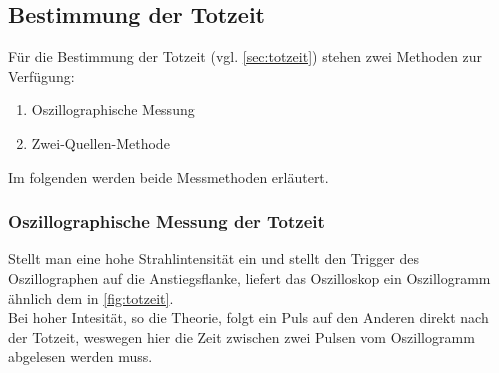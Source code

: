 \subsection{Bestimmung der Totzeit}
\label{sec:bestimmung-totzeit}

Für die Bestimmung der Totzeit (vgl. \autoref{sec:totzeit}) stehen zwei Methoden zur Verfügung:
\begin{enumerate}
	\item Oszillographische Messung
	\item Zwei-Quellen-Methode
\end{enumerate}
Im folgenden werden beide Messmethoden erläutert.

\subsubsection{Oszillographische Messung der Totzeit}
\label{sec:theo:oszillographisch}

Stellt man eine hohe Strahlintensität ein und stellt den Trigger des Oszillographen auf die Anstiegsflanke, liefert
das Oszilloskop ein Oszillogramm ähnlich dem in \autoref{fig:totzeit}.
\\
Bei hoher Intesität, so die Theorie, folgt ein Puls auf den Anderen direkt nach der Totzeit, weswegen hier die
Zeit zwischen zwei Pulsen vom Oszillogramm abgelesen werden muss.
